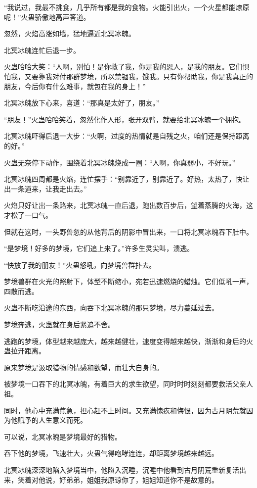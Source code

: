 \begin{this_body}
“我说过，我最不挑食，几乎所有都是我的食物。火能引出火，一个火星都能燎原呢！”火蛊骄傲地高声答道。

忽然，火焰高涨如墙，猛地逼近北冥冰魄。

北冥冰魄连忙后退一步。

火蛊哈哈大笑：“人啊，别怕！是你救了我，你是我的恩人，是我的朋友。它们惧怕我，又要靠我对付那群梦境，所以禁锢我，饿我。只有你帮助我，你是我真正的朋友，今后你有什么难事，就包在我的身上！”

北冥冰魄放下心来，喜道：“那真是太好了，朋友。”

“朋友！”火蛊哈哈笑着，忽然化作人形，张开双臂，就要给北冥冰魄一个拥抱。

北冥冰魄吓得后退一大步：“火啊，过度的热情就是自残之火，咱们还是保持距离的好。”

火蛊无奈停下动作，围绕着北冥冰魄烧成一圈：“人啊，你真弱小，不好玩。”

北冥冰魄四周都是火焰，连忙摆手：“别靠近了，别靠近了。好热，太热了，快让出一条道来，让我走出去。”

火焰只好让出一条路来，北冥冰魄一直后退，跑出数百步后，望着蒸腾的火海，这才松了一口气。

但就在这时，一头野兽忽的从他背后的阴影中冒出来，一口将北冥冰魄吞下肚中。

“是梦境！好多的梦境，它们追上来了。”许多生灵尖叫，溃逃。

“快放了我的朋友！”火蛊怒吼，向梦境兽群扑去。

梦境兽群在火光的照射下，体型不断缩小，宛若迅速燃烧的蜡烛。它们低吼一声，四散而逃。

火蛊不断吃沿途的东西，向吞下北冥冰魄的那只梦境，尽力蔓延过去。

梦境奔逃，火蛊就在身后紧追不舍。

逃跑的梦境，体型越来越庞大，越来越健壮，速度变得越来越快，渐渐和身后的火蛊拉开距离。

原来梦境是汲取猎物的情感和欲望，而壮大自身的。

被梦境一口吞下的北冥冰魄，有着巨大的求生欲望，同时时时刻刻都要救活父亲人祖。

同时，他心中充满焦急，担心赶不上时间。又充满愧疚和悔恨，因为古月阴荒就因为他赋予的人生意义而死。

可以说，北冥冰魄是梦境最好的猎物。

吞下他的梦境，飞速壮大，火蛊气得咆哮连连，却距离梦境越来越远。

北冥冰魄深深地陷入梦境当中，他陷入沉睡，沉睡中他看到古月阴荒重新复活出来，笑着对他说，好弟弟，姐姐我原谅你了，姐姐知道你不是故意的。


\end{this_body}
